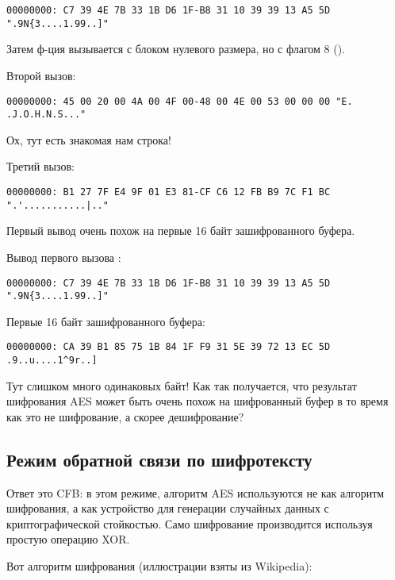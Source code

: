 \begin{lstlisting}
00000000: C7 39 4E 7B 33 1B D6 1F-B8 31 10 39 39 13 A5 5D ".9N{3....1.99..]"
\end{lstlisting}

Затем ф-ция  вызывается с блоком нулевого размера, но с флагом 8 ().

Второй вызов:

\begin{lstlisting}
00000000: 45 00 20 00 4A 00 4F 00-48 00 4E 00 53 00 00 00 "E. .J.O.H.N.S..."
\end{lstlisting}

Ох, тут есть знакомая нам строка!

Третий вызов:

\begin{lstlisting}
00000000: B1 27 7F E4 9F 01 E3 81-CF C6 12 FB B9 7C F1 BC ".'...........|.."
\end{lstlisting}

Первый вывод очень похож на первые 16 байт зашифрованного буфера.

Вывод первого вызова :

\begin{lstlisting}
00000000: C7 39 4E 7B 33 1B D6 1F-B8 31 10 39 39 13 A5 5D ".9N{3....1.99..]"
\end{lstlisting}

Первые 16 байт зашифрованного буфера:

\begin{lstlisting}
00000000: CA 39 B1 85 75 1B 84 1F F9 31 5E 39 72 13 EC 5D  .9..u....1^9r..]
\end{lstlisting}

Тут слишком много одинаковых байт!
Как так получается, что результат шифрования AES может быть очень похож на шифрованный буфер в то время как это
не шифрование, а скорее дешифрование?

\subsection{Режим обратной связи по шифротексту}

Ответ это \ac{CFB}:
в этом режиме, алгоритм AES используются не как алгоритм шифрования, а как устройство для генерации случайных данных
с криптографической стойкостью.
Само шифрование производится используя простую операцию XOR.

Вот алгоритм шифрования (иллюстрации взяты из Wikipedia):

